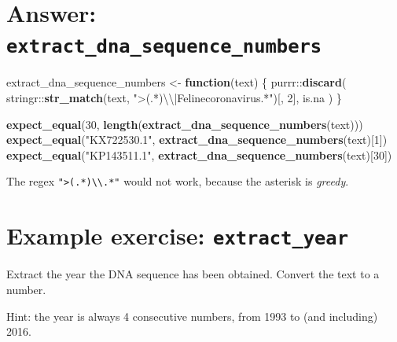 \documentclass[]{book}
\newenvironment{Shaded}{}{}
\newcommand{\CharTok}[1]{\textcolor[rgb]{0.25,0.44,0.63}{#1}}
\newcommand{\ControlFlowTok}[1]{\textcolor[rgb]{0.00,0.44,0.13}{\textbf{#1}}}
\newcommand{\DecValTok}[1]{\textcolor[rgb]{0.25,0.63,0.44}{#1}}
\newcommand{\KeywordTok}[1]{\textcolor[rgb]{0.00,0.44,0.13}{\textbf{#1}}}
\newcommand{\NormalTok}[1]{#1}
\newcommand{\OperatorTok}[1]{\textcolor[rgb]{0.40,0.40,0.40}{#1}}
\newcommand{\StringTok}[1]{\textcolor[rgb]{0.25,0.44,0.63}{#1}}
\begin{document}
\hypertarget{answer-extract_dna_sequence_numbers}{%
\section{\texorpdfstring{Answer: \texttt{extract\_dna\_sequence\_numbers}}{Answer: extract\_dna\_sequence\_numbers}}\label{answer-extract_dna_sequence_numbers}}

\begin{Shaded}
\begin{Highlighting}[]
\NormalTok{extract_dna_sequence_numbers <-}\StringTok{ }\ControlFlowTok{function}\NormalTok{(text) \{}
\NormalTok{  purrr}\OperatorTok{::}\KeywordTok{discard}\NormalTok{(}
\NormalTok{    stringr}\OperatorTok{::}\KeywordTok{str_match}\NormalTok{(text, }\StringTok{">(.*)}\CharTok{\textbackslash{}\textbackslash{}}\StringTok{|Felinecoronavirus.*"}\NormalTok{)[, }\DecValTok{2}\NormalTok{],}
\NormalTok{    is.na}
\NormalTok{  )}
\NormalTok{\}}
\end{Highlighting}
\end{Shaded}

\begin{Shaded}
\begin{Highlighting}[]
\KeywordTok{expect_equal}\NormalTok{(}\DecValTok{30}\NormalTok{, }\KeywordTok{length}\NormalTok{(}\KeywordTok{extract_dna_sequence_numbers}\NormalTok{(text)))}
\KeywordTok{expect_equal}\NormalTok{(}\StringTok{"KX722530.1"}\NormalTok{, }\KeywordTok{extract_dna_sequence_numbers}\NormalTok{(text)[}\DecValTok{1}\NormalTok{])}
\KeywordTok{expect_equal}\NormalTok{(}\StringTok{"KP143511.1"}\NormalTok{, }\KeywordTok{extract_dna_sequence_numbers}\NormalTok{(text)[}\DecValTok{30}\NormalTok{])}
\end{Highlighting}
\end{Shaded}

The regex \texttt{"\textgreater{}(.*)\textbackslash{}\textbackslash{}\textbar{}.*"} would not work, because the asterisk is \emph{greedy}.

\hypertarget{example-exercise-extract_year}{%
\section{\texorpdfstring{Example exercise: \texttt{extract\_year}}{Example exercise: extract\_year}}\label{example-exercise-extract_year}}

Extract the year the DNA sequence has been obtained.
Convert the text to a number.

Hint: the year is always 4 consecutive numbers,
from 1993 to (and including) 2016.
\end{document}
